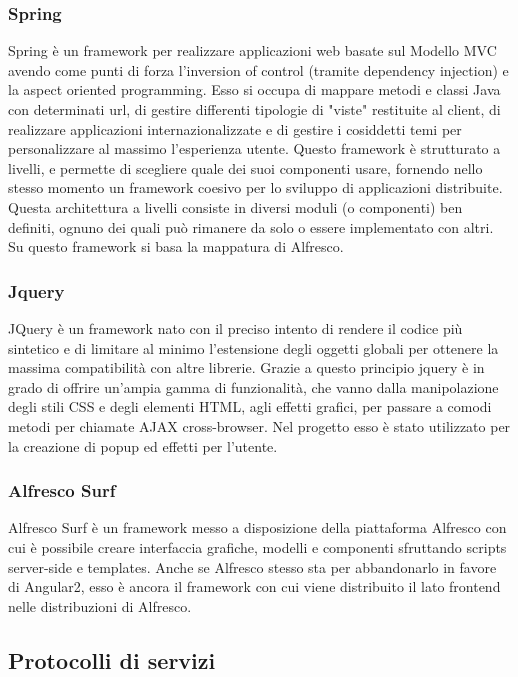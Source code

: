 \subsubsection{Spring}
Spring è un framework per realizzare applicazioni web basate sul Modello MVC
avendo come punti di forza l’inversion of control (tramite dependency injection) e la
aspect oriented programming. Esso si occupa di mappare metodi e classi Java con
determinati url, di gestire differenti tipologie di "viste" restituite al client, di realizzare
applicazioni internazionalizzate e di gestire i cosiddetti temi per personalizzare al
massimo l’esperienza utente. Questo framework è strutturato a livelli, e permette di
scegliere quale dei suoi componenti usare, fornendo nello stesso momento un framework
coesivo per lo sviluppo di applicazioni distribuite. Questa architettura a livelli consiste
in diversi moduli (o componenti) ben definiti, ognuno dei quali può rimanere da solo o
essere implementato con altri.
Su questo framework si basa la mappatura di Alfresco.
\subsubsection{Jquery}
JQuery è un framework nato con il preciso intento di rendere il codice più sintetico
e di limitare al minimo l’estensione degli oggetti globali per ottenere la massima
compatibilità con altre librerie. Grazie a questo principio jquery è in grado di offrire
un’ampia gamma di funzionalità, che vanno dalla manipolazione degli stili CSS e degli
elementi HTML, agli effetti grafici, per passare a comodi metodi per chiamate AJAX
cross-browser. Nel progetto esso è stato utilizzato per la creazione di popup ed effetti per l'utente.
\subsubsection{Alfresco Surf}
Alfresco Surf è un framework messo a disposizione della piattaforma Alfresco con cui è
possibile creare interfaccia grafiche, modelli e componenti sfruttando scripts server-side
e templates.
Anche se Alfresco stesso sta per abbandonarlo in favore di Angular2, esso è ancora il framework con cui viene distribuito il lato frontend nelle distribuzioni di Alfresco.
\subsection{Protocolli di servizi}
